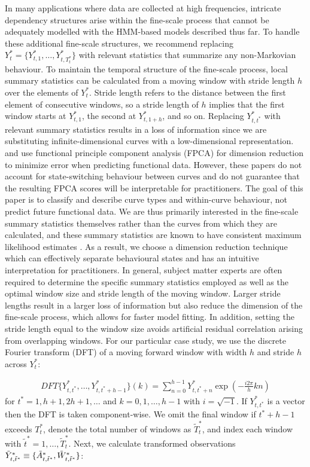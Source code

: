 In many applications where data are collected at high frequencies, intricate dependency structures arise within the fine-scale process that cannot be adequately modelled with the HMM-based models described thus far. To handle these additional fine-scale structures, we recommend replacing $Y^*_t = \{Y^*_{t,1},\ldots,Y^*_{t,T^*_t}\}$ with relevant statistics that summarize any non-Markovian behaviour. To maintain the temporal structure of the fine-scale process, local summary statistics can be calculated from a moving window with stride length $h$ over the elements of $Y^*_t$. Stride length refers to the distance between the first element of consecutive windows, so a stride length of $h$ implies that the first window starts at $Y^*_{t,1}$, the second at $Y^*_{t,1+h}$, and so on.
Replacing $Y^*_{t,t^*}$ with relevant summary statistics results in a loss of information since we are substituting infinite-dimensional curves with a low-dimensional representation. \citet{Aue:2015} and \citet{Gao:2019} use functional principle component analysis (FPCA) for dimension reduction to minimize error when predicting functional data. However, these papers do not account for state-switching behaviour between curves and do not guarantee that the resulting FPCA scores will be interpretable for practitioners. The goal of this paper is to classify and describe curve types and within-curve behaviour, not predict future functional data. We are thus primarily interested in the fine-scale summary statistics themselves rather than the curves from which they are calculated, and these summary statistics are known to have consistent maximum likelihood estimates \cite{Douc:2004}. As a result, we choose a dimension reduction technique which can effectively separate behavioural states and has an intuitive interpretation for practitioners.
In general, subject matter experts are often required to determine the specific summary statistics employed as well as the optimal window size and stride length of the moving window. Larger stride lengths result in a larger loss of information but also reduce the dimension of the fine-scale process, which allows for faster model fitting. In addition, setting the stride length equal to the window size avoids artificial residual correlation arising from overlapping windows. For our particular case study, we use the discrete Fourier transform (DFT) of a moving forward window with width $h$ and stride $h$ across $Y^*_t$:

\begin{align}
    DFT\{Y^*_{t,t^*},\ldots, Y^*_{t,t^*+h-1}\}(k) = \sum_{n=0}^{h-1} Y^*_{t,t^*+n}\exp\left(-\frac{i 2\pi}{h} kn \right)
    \label{eq:DFTdef}
\end{align}
%
for $t^* = 1,h+1,2h+1,\ldots$ and $k = 0, 1, \ldots, h-1$ with $i = \sqrt{-1}$. If $Y^*_{t,t^*}$ is a vector then the DFT is taken component-wise. We omit the final window if $t^*+h-1$ exceeds $T^*_t$, denote the total number of windows as $\tilde T^*_t$, and index each window with $\tilde{t}^* = 1,\ldots,\tilde T^*_t$. Next, we calculate transformed observations $\tilde{Y}^*_{t,\tilde{t}^*} \equiv \{\tilde{A}^*_{t,\tilde{t}^*},\tilde{W}^*_{t,\tilde{t}^*}\}$:

